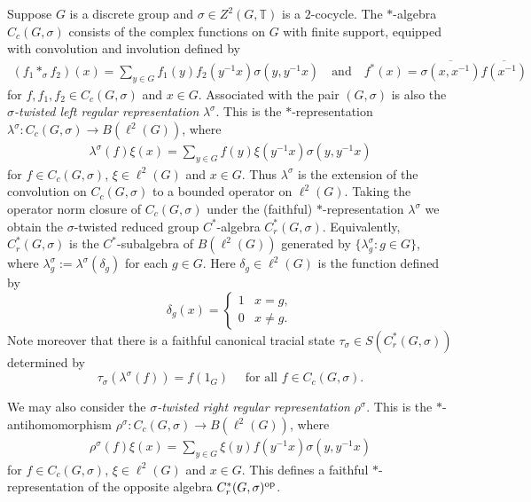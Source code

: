 \documentclass[11pt, a4paper, oneside, final, reqno]{amsart}
\newcommand{\bbT}{\mathbb{T}}
\newcommand{\Cred}{C^*_r}
\theoremstyle{definition}
\theoremstyle{plain}
\theoremstyle{remark}
\numberwithin{equation}{section}
\begin{document}
Suppose  $G$ is a discrete group and $\sigma \in Z^2(G, \bbT)$ is a $2$-cocycle. The $*$-algebra $C_c(G, \sigma)$ consists of the complex functions on $G$ with finite support, equipped with convolution and involution defined by
\begin{align*}
    (f_1*_\sigma f_2) (x) = \sum_{y \in G} f_1(y) f_2(y^{-1}x) \sigma(y,y^{-1}x) \quad \text{and} \quad f^*(x) = \overline{\sigma(x,x^{-1})} \overline{f(x^{-1})}
\end{align*}
for $f, f_1, f_2 \in C_c(G, \sigma)$ and $x \in G$. Associated with the pair $(G,\sigma)$ is also the \emph{$\sigma$-twisted left regular representation} $\lambda^\sigma$. This is the $*$-representation $ \lambda^\sigma \colon C_c(G,\sigma) \to B(\ell^2(G))$, where
\begin{align*}
    \lambda^\sigma(f) \xi (x) = \sum_{y \in G} f(y) \xi(y^{-1}x) \sigma(y,y^{-1}x)
\end{align*}
for $f \in C_c (G, \sigma)$, $\xi \in \ell^2(G)$ and $x\in G$. Thus $\lambda^\sigma$ is the extension of the convolution on $C_c(G,\sigma)$ to a bounded operator on $\ell^2(G)$. Taking the operator norm closure of $C_c(G,\sigma)$ under the (faithful) $*$-representation $\lambda^\sigma$ we obtain the $\sigma$-twisted reduced group $C^*$-algebra $C^*_r(G, \sigma)$. Equivalently,  $\Cred(G,\sigma)$ is the $C^*$-subalgebra of $B(\ell^2(G))$ generated by $\{\lambda^\sigma_g :g \in G\}$, where $\lambda^\sigma_g := \lambda^\sigma(\delta_g)$ for each $g\in G$. Here $\delta_g \in \ell^2(G)$ is the function defined by
\begin{equation*}
    \delta_g(x) =
    \begin{cases}
        1 & x = g, \\
        0 & x \neq g.
    \end{cases}
\end{equation*}
Note moreover that there is a faithful canonical tracial state $\tau_\sigma \in S(\Cred(G,\sigma))$ determined by
\begin{equation*}
    \tau_\sigma(\lambda^\sigma(f)) = f(1_G) \quad \text{ for all } f\in C_c(G,\sigma).
\end{equation*}

We may also consider the \emph{$\sigma$-twisted right regular representation} $\rho^\sigma$. This is the  $*$-antihomomorphism $\rho^\sigma \colon C_c(G,\sigma) \to B(\ell^2(G))$, where
\begin{align*}
    \rho^\sigma(f) \xi (x) = \sum_{y \in G} \xi(y) f(y^{-1}x) \sigma(y,y^{-1}x)
\end{align*}
for $f \in C_c (G, \sigma)$, $\xi \in \ell^2(G)$ and $x\in G$. This defines a faithful $*$-representation of the opposite algebra $\Cred(G,\sigma)^{\rm op}$.
\end{document}
